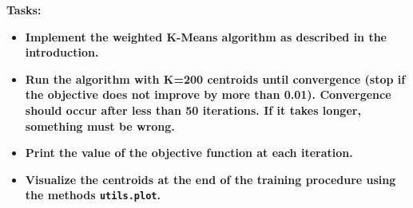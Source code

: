 \documentclass[11pt]{article}
\begin{document}
\textbf{Tasks:}

\begin{itemize}
\item
  \textbf{Implement the weighted K-Means algorithm as described in the
  introduction.}
\item
  \textbf{Run the algorithm with K=200 centroids until convergence (stop
  if the objective does not improve by more than 0.01). Convergence
  should occur after less than 50 iterations. If it takes longer,
  something must be wrong.}
\item
  \textbf{Print the value of the objective function at each iteration.}
\item
  \textbf{Visualize the centroids at the end of the training procedure
  using the methods \texttt{utils.plot}.}
\end{itemize}
\end{document}
